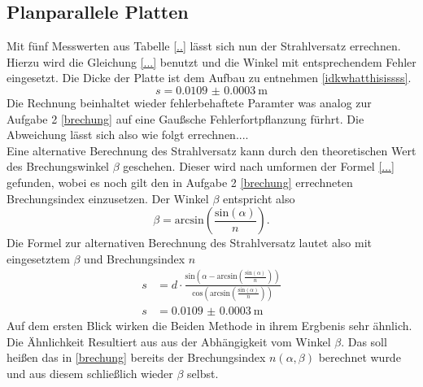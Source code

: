 \subsection{Planparallele Platten}
Mit fünf Messwerten aus Tabelle \ref{..} lässt sich nun der Strahlversatz errechnen. Hierzu wird die Gleichung \eqref{...}
benutzt und die Winkel mit entsprechendem Fehler eingesetzt. Die Dicke der Platte ist dem Aufbau zu entnehmen \ref{idkwhatthisissss}.
\begin{equation*}
    s = \SI{0.0109(00003)}{\meter}
\end{equation*}
Die Rechnung beinhaltet wieder fehlerbehaftete Paramter was analog zur Aufgabe 2 \ref{brechung} auf eine Gaußsche Fehlerfortpflanzung 
fürhrt. Die Abweichung lässt sich also wie folgt errechnen....
\\

Eine alternative Berechnung des Strahlversatz kann durch den theoretischen Wert des Brechungswinkel $\beta$ geschehen. 
Dieser wird nach umformen der Formel \eqref{...} gefunden, wobei es noch gilt den in Aufgabe 2 \ref{brechung} errechneten Brechungsindex
einzusetzen. Der Winkel $\beta$ entspricht also
\begin{equation*}
    \beta  = \text{arcsin} \left( \frac{\text{sin}(\alpha)}{n}\right).
\end{equation*}
Die Formel zur alternativen Berechnung des Strahlversatz lautet also mit eingesetztem $\beta$ und Brechungsindex $n$
\begin{align*}
    s &= d  \cdot \frac{\text{sin} \left (  \alpha- \text{arcsin} \left( \frac{\text{sin}(\alpha)}{n}\right) \right)} {\text{cos}\left(\text{arcsin} \left( \frac{\text{sin}(\alpha)}{n}\right)\right)}\\
    s &= \SI{0.0109(00003)}{\meter}
\end{align*}
Auf dem ersten Blick wirken die Beiden Methode in ihrem Ergbenis sehr ähnlich. Die Ähnlichkeit Resultiert aus 
aus der Abhängigkeit vom Winkel $\beta$. Das soll heißen das in \ref{brechung} bereits der Brechungsindex $n(\alpha, \beta)$
berechnet wurde und aus diesem schließlich wieder $\beta$ selbst. 

